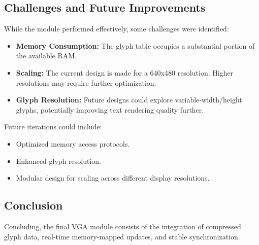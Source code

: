\documentclass{subfile}
\begin{document}
  \subsection{Challenges and Future Improvements}
  While the module performed effectively, some challenges were identified:
  \begin{itemize}
      \item \textbf{Memory Consumption:} The glyph table occupies a substantial portion of the available RAM. 
      \item \textbf{Scaling:} The current design is made for a 640x480 resolution. Higher resolutions may require further optimization.
      \item \textbf{Glyph Resolution:} Future designs could explore variable-width/height glyphs, potentially improving text rendering quality further.
  \end{itemize}

  Future iterations could include:
  \begin{itemize}
      \item Optimized memory access protocols.
      \item Enhanced glyph resolution.
      \item Modular design for scaling across different display resolutions.
  \end{itemize}

  \subsection{Conclusion}
  Concluding, the final VGA module consists of the integration of compressed glyph data, real-time memory-mapped updates, and stable synchronization. 
\end{document}
